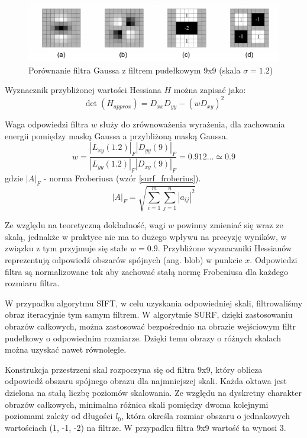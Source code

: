 \begin{figure}[h]
	\centering
	\includegraphics[scale=1.7]{graphics/01_podstawy_teoretyczne/surf-box-filters.pdf}
	\caption{Porównanie filtra Gaussa z filtrem pudełkowym 9x9 (skala $\sigma = 1.2$) \cite{BAY08}}
	\label{fig:surf-box-filters}
\end{figure}

Wyznacznik przybliżonej wartości Hessiana $H$ można zapisać jako:
\begin{equation} 
\label{surf_hessian_det}
\det(H_{approx}) = D_{xx} D_{yy} - (w D_{xy})^2
\end{equation}

Waga odpowiedzi filtra $w$ służy do zrównoważenia wyrażenia, dla zachowania energii pomiędzy maską Gaussa a przybliżoną maską Gaussa.
\begin{equation} 
\label{surf_hessian_approx_w}
w = \frac{|L_{xy}(1.2)|_F |D_{yy}(9)|_F}{|L_{yy}(1.2)|_F |D_{xy}(9)|_F} = 0.912... \simeq 0.9
\end{equation} gdzie $|A|_F$ - norma Froberiusa (wzór \ref{surf_froberius}).
\begin{equation} 
\label{surf_froberius}
|A|_F = \sqrt{\sum\limits_{i=1}^m \sum\limits_{j=1}^n |a_{ij}|^2}
\end{equation}

Ze względu na teoretyczną dokładność, wagi $w$ powinny zmieniać się wraz ze skalą, jednakże w praktyce nie ma to dużego wpływu na precyzję wyników, w związku z tym przyjmuje się stałe $w = 0.9$. Przybliżone wyznaczniki Hessianów reprezentują odpowiedź obszarów spójnych ({ang. blob}) w punkcie $x$. Odpowiedzi filtra są normalizowane tak aby zachować stałą normę Frobeniusa dla każdego rozmiaru filtra.

W przypadku algorytmu SIFT, w celu uzyskania odpowiedniej skali, filtrowaliśmy obraz iteracyjnie tym samym filtrem. W algorytmie SURF, dzięki zastosowaniu obrazów całkowych, można zastosować bezpośrednio na obrazie wejściowym filtr pudełkowy o odpowiednim rozmiarze. Dzięki temu obrazy o różnych skalach można uzyskać nawet równolegle. 

Konstrukcja przestrzeni skal rozpoczyna się od filtra 9x9, który oblicza odpowiedź obszaru spójnego obrazu dla najmniejszej skali. Każda oktawa jest dzielona na stałą liczbę poziomów skalowania. Ze względu na dyskretny charakter obrazów całkowych, minimalna różnica skali pomiędzy dwoma kolejnymi poziomami zależy od długości $l_0$, która określa rozmiar obszaru o jednakowych wartościach (1, -1, -2) na filtrze. W przypadku filtra 9x9 wartość ta wynosi 3.

